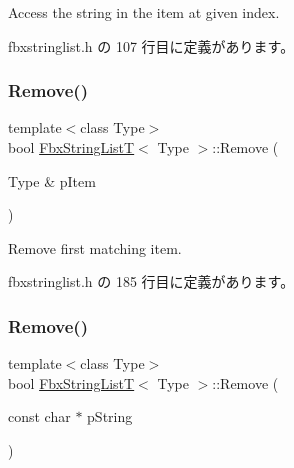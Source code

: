 Access the string in the item at given index. 



 fbxstringlist.\+h の 107 行目に定義があります。

\mbox{\label{class_fbx_string_list_t_aa9085a3f134422ecebbd406d0ce2025d}} 
\subsubsection{\texorpdfstring{Remove()}{Remove()}\hspace{0.1cm}{\footnotesize\ttfamily [1/2]}}
{\footnotesize\ttfamily template$<$class Type$>$ \\
bool \hyperlink{class_fbx_string_list_t}{Fbx\+String\+ListT}$<$ Type $>$\+::Remove (\begin{DoxyParamCaption}\item[{Type \&}]{p\+Item }\end{DoxyParamCaption})\hspace{0.3cm}{\ttfamily [inline]}}



Remove first matching item. 



 fbxstringlist.\+h の 185 行目に定義があります。

\mbox{\label{class_fbx_string_list_t_ad8581d1b4206633b7c0ccfebe8bb3bdf}} 
\subsubsection{\texorpdfstring{Remove()}{Remove()}\hspace{0.1cm}{\footnotesize\ttfamily [2/2]}}
{\footnotesize\ttfamily template$<$class Type$>$ \\
bool \hyperlink{class_fbx_string_list_t}{Fbx\+String\+ListT}$<$ Type $>$\+::Remove (\begin{DoxyParamCaption}\item[{const char $\ast$}]{p\+String }\end{DoxyParamCaption})\hspace{0.3cm}{\ttfamily [inline]}}



